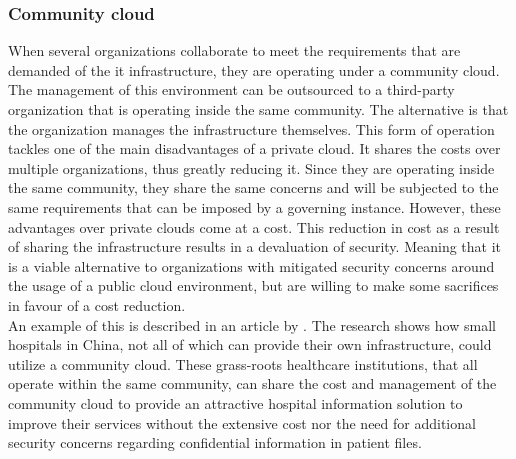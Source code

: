 \subsubsection{Community cloud}
When several organizations collaborate to meet the requirements that are demanded of the \acrshort{it} infrastructure, they are operating under a community cloud. 
The management of this environment can be outsourced to a third-party organization that is operating inside the same community. The alternative is that the organization manages the infrastructure themselves.
This form of operation tackles one of the main disadvantages of a private cloud. It shares the costs over multiple organizations, thus greatly reducing it. 
Since they are operating inside the same community, they share the same concerns and will be subjected to the same requirements that can be imposed by a governing instance. 
However, these advantages over private clouds come at a cost. 
This reduction in cost as a result of sharing the infrastructure results in a devaluation of security. 
Meaning that it is a viable alternative to organizations with mitigated security concerns around the usage of a public cloud environment, but are willing to make some sacrifices in favour of a cost reduction. 
\\
An example of this is described in an article by \textcite{Yao2014}. 
The research shows how small hospitals in China, not all of which can provide their own infrastructure, could utilize a community cloud. 
These grass-roots healthcare institutions, that all operate within the same community, can share the cost and management of the community cloud to provide an attractive hospital information solution to improve their services without the extensive cost nor the need for additional security concerns regarding confidential information in patient files.

